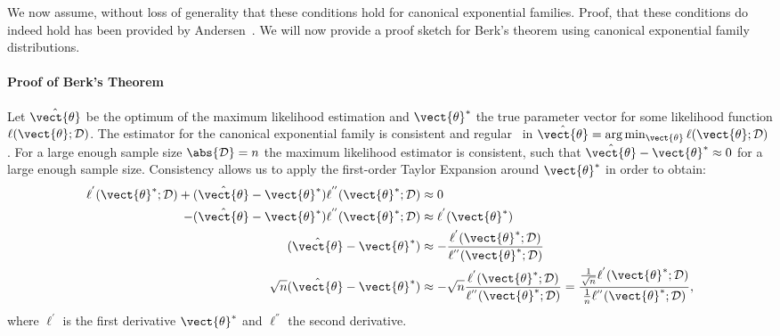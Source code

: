         We now assume, without loss of generality that these conditions hold for canonical exponential families.
        Proof, that these conditions do indeed hold has been provided by Andersen~\cite{andersen1970asymptotic}.
        We will now provide a proof sketch for Berk's theorem using canonical exponential family distributions.

        \paragraph*{Proof of Berk's Theorem}
        Let $\hat{\vect{\theta}}$ be the optimum of the maximum likelihood estimation and $\vect{\theta}^*$ the true parameter vector for some likelihood function $\ell(\vect{\theta}; \mathcal{D})$.
        The estimator for the canonical exponential family is consistent and regular~\cite{berk1972consistency}  in  $\hat{\vect{\theta}} = \arg\min_{\vect{\theta}} \ell(\vect{\theta}; \mathcal{D})$.
        For a large enough sample size $\abs{\mathcal{D}} = n$ the maximum likelihood estimator  is consistent, such that $\hat{\vect{\theta}} - \vect{\theta}^* \approx 0$ for a large enough sample size. 
        Consistency allows us to apply the first-order Taylor Expansion around $\vect{\theta}^*$ in order to obtain:
        \begin{equation}
            \label{eq:ll_general}
            \begin{split}
                 \ell^{'}(\vect{\theta}^*; \mathcal{D}) +(\hat{\vect{\theta}} - \vect{\theta}^*) \ell^{''}(\vect{\theta}^*; \mathcal{D}) &\approx 0 \\
            - (\hat{\vect{\theta}} - \vect{\theta}^*) \ell^{''}(\vect{\theta}^*; \mathcal{D})&  \approx \ell^{'}(\vect{\theta}^*) \\
            (\hat{\vect{\theta}} - \vect{\theta}^*)  &\approx - \frac{ \ell^{'}(\vect{\theta}^*; \mathcal{D}) }{ \ell^{''}(\vect{\theta}^*; \mathcal{D})} \\
            \sqrt{n}(\hat{\vect{\theta}} - \vect{\theta}^*)  &\approx - \sqrt{n} \frac{ \ell^{'}(\vect{\theta}^*; \mathcal{D}) }{ \ell^{''}(\vect{\theta}^*; \mathcal{D})} =  \frac{\frac{1}{\sqrt{n}} \ell^{'}(\vect{\theta}^*; \mathcal{D}) }{ \frac{1}{n}\ell^{''}(\vect{\theta}^*; \mathcal{D})}, \\
            \end{split}
        \end{equation}
        where $\ell^{'}$ is the first derivative \wrt $\vect{\theta}^*$ and $\ell^{''}$ the second derivative.
